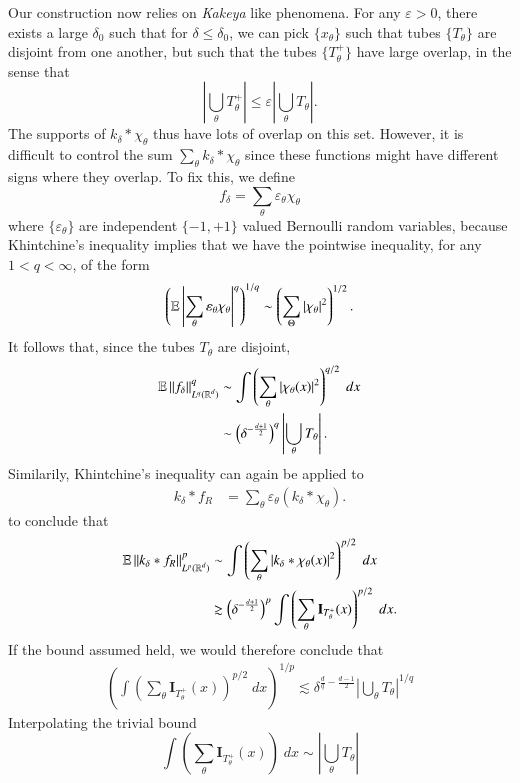 Our construction now relies on \emph{Kakeya} like phenomena. For any $\varepsilon > 0$, there exists a large $\delta_0$ such that for $\delta \leq \delta_0$, we can pick $\{ x_\theta \}$ such that tubes $\{ T_\theta \}$ are disjoint from one another, but such that the tubes $\{ T_\theta^+ \}$ have large overlap, in the sense that
%
\[ | \bigcup_\theta T_\theta^+ | \leq \varepsilon | \bigcup_\theta T_\theta|. \]
%
The supports of $k_\delta * \chi_\theta$ thus have lots of overlap on this set. However, it is difficult to control the sum $\sum_\theta k_\delta * \chi_\theta$ since these functions might have different signs where they overlap. To fix this, we define
%
\[ f_\delta = \sum_\theta \varepsilon_\theta \chi_\theta \]
%
where $\{ \varepsilon_\theta \}$ are independent $\{ -1, +1 \}$ valued Bernoulli random variables, because Khintchine's inequality implies that we have the pointwise inequality, for any $1 < q < \infty$, of the form
%
\[ \left( \operatorname{\mathbb{E}} \left| \sum_\theta \varepsilon_\theta \chi_\theta \right|^q \right)^{1/q} \sim \left( \sum_\Theta |\chi_\theta|^2 \right)^{1/2}. \]
%
It follows that, since the tubes $T_\theta$ are disjoint,
%
\begin{align*}
    \operatorname{\mathbb{E}} \| f_\delta \|_{L^q(\operatorname{\mathbb{R}}^d)}^q &\sim \int \left( \sum_\theta |\chi_\theta(x)|^2 \right)^{q/2}\; dx\\
    &\sim \left( \delta^{- \frac{d+1}{2}} \right)^q \left| \bigcup_\theta T_\theta \right|.
\end{align*}
%
Similarily, Khintchine's inequality can again be applied to
%
\begin{align*}
    k_\delta * f_R &= \sum_\theta \varepsilon_\theta (k_\delta * \chi_\theta).
\end{align*}
%
to conclude that
%
\begin{align*}
    \operatorname{\mathbb{E}} \| k_\delta * f_R \|_{L^p(\operatorname{\mathbb{R}}^d)}^p &\sim \int \left( \sum_\theta |k_\delta * \chi_\theta(x)|^2 \right)^{p/2}\; dx\\
    &\gtrsim \left( \delta^{- \frac{d+1}{2}} \right)^p \int \left( \sum_\theta \mathbf{I}_{T_\theta^+}(x) \right)^{p/2}\; dx.
\end{align*}
%
If the bound assumed held, we would therefore conclude that
%
\begin{align*}
    \left( \int \left( \sum_\theta \mathbf{I}_{T_\theta^+}(x) \right)^{p/2}\; dx \right)^{1/p} \lesssim \delta^{ \frac{d}{q} - \frac{d-1}{2} } \left| \bigcup_\theta T_\theta \right|^{1/q}
\end{align*}
%
Interpolating the trivial bound
%
\[ \int \left( \sum_\theta \mathbf{I}_{T_\theta^+}(x) \right)\; dx \sim \left| \bigcup_\theta T_\theta \right| \]
